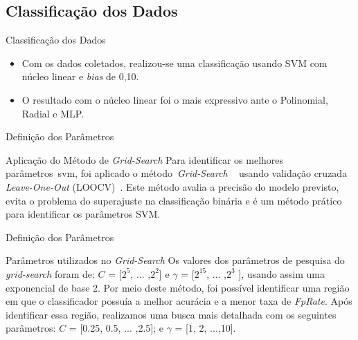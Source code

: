 \documentclass{beamer}
\begin{document}
\subsection{Classificação dos Dados}
\begin{frame}{Classificação dos Dados}
	\begin{block}{}
		\begin{itemize}[<+->]
			\item	Com os dados coletados, realizou-se uma classificação usando SVM com núcleo linear e \textit{bias} de 0,10.
			\item	O resultado com o núcleo linear foi o mais expressivo ante o Polinomial, Radial e MLP.
		\end{itemize}
	\end{block}
\end{frame}

\begin{frame}{Definição dos Parâmetros}
 \begin{block}{Aplicação do Método de \textit{Grid-Search}}
 Para identificar os melhores parâmetros~\ac{svm}, foi aplicado o método~\textit{Grid-Search} ~\cite{gridsearchsvm2010} usando validação cruzada \textit{Leave-One-Out} (LOOCV)~\cite{kantardzic2011data}. Este método avalia a precisão do modelo previsto, evita o problema do superajuste na classificação binária e é um método prático para identificar os parâmetros SVM.  
 \end{block}
\end{frame}

\begin{frame}{Definição dos Parâmetros}
 \begin{block}{Parâmetros utilizados no \textit{Grid-Search}}
    Os valores dos parâmetros de pesquisa do \textit{grid-search} foram de: $C$ = [$2^5$, ... ,$2^2$] e $\gamma$ = [$2^{15}$, ... ,$2^3$ ], usando assim uma exponencial de base 2. Por meio deste método, foi possível identificar uma região em que o classificador possuía a melhor acurácia e a menor taxa de \textit{FpRate}. Após identificar essa região, realizamos uma busca mais detalhada com os seguintes parâmetros: $C$ = [0.25, 0.5, ... ,2.5]; e $\gamma$ = [1, 2, ...,10].
 \end{block}
\end{frame}
\end{document}
